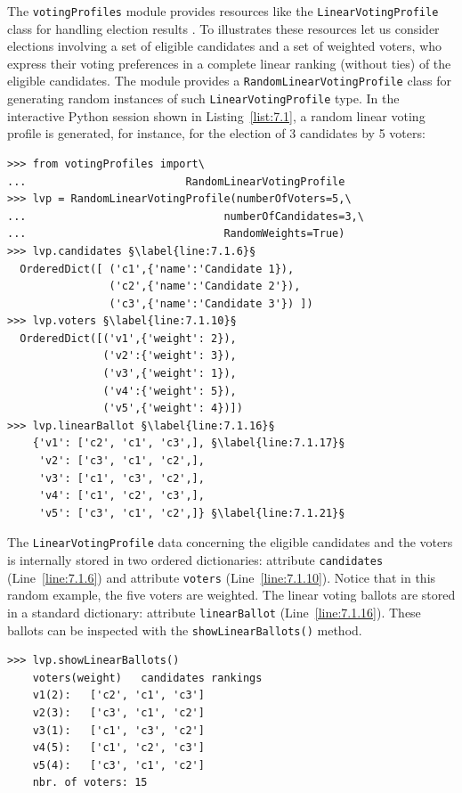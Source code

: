 The \texttt{votingProfiles} module provides resources like the \texttt{LinearVoting\-Profile} class for handling election results \citep{ADT-L2}. To illustrates these resources let us consider elections involving a set of eligible candidates and a set of weighted voters, who express their voting preferences in a complete linear ranking (without ties) of the eligible candidates. The module provides a \texttt{RandomLinear\-VotingProfile} class  for generating random instances of such \texttt{LinearVot\-ingProfile} type. In the interactive Python session shown in Listing~\vref{list:7.1}, a random linear voting profile is generated, for instance, for the election of 3 candidates by 5 voters:
\begin{lstlisting}[caption={Example of random linear voting profile},label=list:7.1]
>>> from votingProfiles import\
...                         RandomLinearVotingProfile
>>> lvp = RandomLinearVotingProfile(numberOfVoters=5,\
...                               numberOfCandidates=3,\
...                               RandomWeights=True) 
>>> lvp.candidates §\label{line:7.1.6}§
  OrderedDict([ ('c1',{'name':'Candidate 1}),
                ('c2',{'name':'Candidate 2'}),
                ('c3',{'name':'Candidate 3'}) ])
>>> lvp.voters §\label{line:7.1.10}§
  OrderedDict([('v1',{'weight': 2}),
               ('v2':{'weight': 3}), 
               ('v3',{'weight': 1}),
               ('v4':{'weight': 5}),
               ('v5',{'weight': 4})])
>>> lvp.linearBallot §\label{line:7.1.16}§
    {'v1': ['c2', 'c1', 'c3',], §\label{line:7.1.17}§
     'v2': ['c3', 'c1', 'c2',],
     'v3': ['c1', 'c3', 'c2',],
     'v4': ['c1', 'c2', 'c3',],
     'v5': ['c3', 'c1', 'c2',]} §\label{line:7.1.21}§
 \end{lstlisting}

The \texttt{LinearVotingProfile} data concerning the eligible candidates and the voters is internally stored in two ordered dictionaries: attribute \texttt{candidates} (Line~\ref{line:7.1.6}) and attribute \texttt{voters} (Line~\ref{line:7.1.10}). Notice that in this random example, the five voters are weighted. The linear voting ballots are stored in a standard dictionary: attribute \texttt{linearBallot} (Line~\ref{line:7.1.16}). These ballots can be inspected with the \texttt{showLinearBallots()} method.
\begin{lstlisting}[caption={Showing linear voting profiles},label=list:7.2]
>>> lvp.showLinearBallots()
    voters(weight)	 candidates rankings
    v1(2): 	 ['c2', 'c1', 'c3']
    v2(3): 	 ['c3', 'c1', 'c2']
    v3(1): 	 ['c1', 'c3', 'c2']
    v4(5): 	 ['c1', 'c2', 'c3']
    v5(4): 	 ['c3', 'c1', 'c2']
    nbr. of voters: 15
\end{lstlisting}

